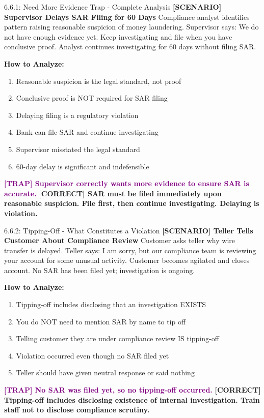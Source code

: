 \documentclass[11pt,a4paper]{beamer}
\newcommand{\trap}[1]{\textcolor{purple}{\textbf{[TRAP] #1}}}
\newcommand{\correct}[1]{\textcolor{green!50!black}{\textbf{[CORRECT] #1}}}
\newcommand{\scenario}[1]{\textcolor{blue!70!black}{\textbf{[SCENARIO] #1}}}
\begin{document}
\begin{frame}{6.6.1: Need More Evidence Trap - Complete Analysis}
	\scenario{Supervisor Delays SAR Filing for 60 Days}
	Compliance analyst identifies pattern raising reasonable suspicion of money laundering. Supervisor says: We do not have enough evidence yet. Keep investigating and file when you have conclusive proof. Analyst continues investigating for 60 days without filing SAR.
	
	\vspace{0.1cm}
	\textbf{How to Analyze:}
	\begin{enumerate}
		\item Reasonable suspicion is the legal standard, not proof
		\item Conclusive proof is NOT required for SAR filing
		\item Delaying filing is a regulatory violation
		\item Bank can file SAR and continue investigating
		\item Supervisor misstated the legal standard
		\item 60-day delay is significant and indefensible
	\end{enumerate}
	\trap{Supervisor correctly wants more evidence to ensure SAR is accurate.}
	\correct{SAR must be filed immediately upon reasonable suspicion. File first, then continue investigating. Delaying is violation.}
\end{frame}

\begin{frame}{6.6.2: Tipping-Off - What Constitutes a Violation}
	\scenario{Teller Tells Customer About Compliance Review}
	Customer asks teller why wire transfer is delayed. Teller says: I am sorry, but our compliance team is reviewing your account for some unusual activity. Customer becomes agitated and closes account. No SAR has been filed yet; investigation is ongoing.
	
	\vspace{0.1cm}
	\textbf{How to Analyze:}
	\begin{enumerate}
		\item Tipping-off includes disclosing that an investigation EXISTS
		\item You do NOT need to mention SAR by name to tip off
		\item Telling customer they are under compliance review IS tipping-off
		\item Violation occurred even though no SAR filed yet
		\item Teller should have given neutral response or said nothing
	\end{enumerate}
	\trap{No SAR was filed yet, so no tipping-off occurred.}
	\correct{Tipping-off includes disclosing existence of internal investigation. Train staff not to disclose compliance scrutiny.}
\end{frame}
\end{document}

